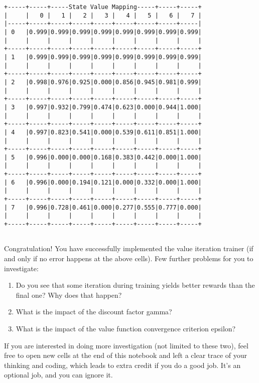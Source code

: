 \documentclass[11pt]{article}
\providecommand{\tightlist}{%
      \setlength{\itemsep}{0pt}\setlength{\parskip}{0pt}}
\begin{document}
    \begin{Verbatim}[commandchars=\\\{\}]
+-----+-----+-----State Value Mapping-----+-----+-----+
|     |   0 |   1 |   2 |   3 |   4 |   5 |   6 |   7 |
|-----+-----+-----+-----+-----+-----+-----+-----+-----|
| 0   |0.999|0.999|0.999|0.999|0.999|0.999|0.999|0.999|
|     |     |     |     |     |     |     |     |     |
+-----+-----+-----+-----+-----+-----+-----+-----+-----+
| 1   |0.999|0.999|0.999|0.999|0.999|0.999|0.999|0.999|
|     |     |     |     |     |     |     |     |     |
+-----+-----+-----+-----+-----+-----+-----+-----+-----+
| 2   |0.998|0.976|0.925|0.000|0.856|0.945|0.981|0.999|
|     |     |     |     |     |     |     |     |     |
+-----+-----+-----+-----+-----+-----+-----+-----+-----+
| 3   |0.997|0.932|0.799|0.474|0.623|0.000|0.944|1.000|
|     |     |     |     |     |     |     |     |     |
+-----+-----+-----+-----+-----+-----+-----+-----+-----+
| 4   |0.997|0.823|0.541|0.000|0.539|0.611|0.851|1.000|
|     |     |     |     |     |     |     |     |     |
+-----+-----+-----+-----+-----+-----+-----+-----+-----+
| 5   |0.996|0.000|0.000|0.168|0.383|0.442|0.000|1.000|
|     |     |     |     |     |     |     |     |     |
+-----+-----+-----+-----+-----+-----+-----+-----+-----+
| 6   |0.996|0.000|0.194|0.121|0.000|0.332|0.000|1.000|
|     |     |     |     |     |     |     |     |     |
+-----+-----+-----+-----+-----+-----+-----+-----+-----+
| 7   |0.996|0.728|0.461|0.000|0.277|0.555|0.777|0.000|
|     |     |     |     |     |     |     |     |     |
+-----+-----+-----+-----+-----+-----+-----+-----+-----+


    \end{Verbatim}

    Congratulation! You have successfully implemented the value iteration
trainer (if and only if no error happens at the above cells). Few
further problems for you to investigate:

\begin{enumerate}
\def\labelenumi{\arabic{enumi}.}
\tightlist
\item
  Do you see that some iteration during training yields better rewards
  than the final one? Why does that happen?
\item
  What is the impact of the discount factor gamma?
\item
  What is the impact of the value function convergence criterion
  epsilon?
\end{enumerate}

If you are interested in doing more investigation (not limited to these
two), feel free to open new cells at the end of this notebook and left a
clear trace of your thinking and coding, which leads to extra credit if
you do a good job. It's an optional job, and you can ignore it.
\end{document}
